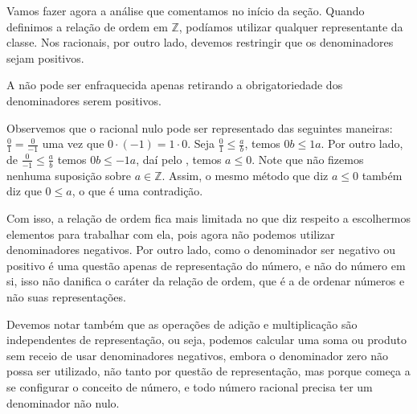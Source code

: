 \documentclass[../main.tex]{subfiles}
\begin{document}
Vamos fazer agora a análise que comentamos no início da seção. Quando definimos a relação de ordem em $\mathbb{Z}$, podíamos utilizar qualquer representante da classe. Nos racionais, por outro lado, devemos restringir que os denominadores sejam positivos.

\begin{afi}
    A  não pode ser enfraquecida apenas retirando a obrigatoriedade dos denominadores serem positivos.
\end{afi}

\begin{dem}
    Observemos que o racional nulo pode ser representado das seguintes maneiras: $\frac{0}{1} = \frac{0}{-1}$ uma vez que $0 \cdot (-1) = 1 \cdot 0$.
    Seja $\frac{0}{1} \leq \frac{a}{b}$, temos $0b \leq 1a$. Por outro lado, de $\frac{0}{-1} \leq \frac{a}{b}$ temos $0b \leq -1a$,
    daí pelo , temos $a \leq 0$. Note que não fizemos nenhuma suposição sobre $a \in \mathbb{Z}$. Assim, o mesmo método que diz $a \leq 0$ também diz que $0 \leq a$, o que é uma contradição.
\end{dem}

Com isso, a relação de ordem fica mais limitada no que diz respeito a escolhermos elementos para trabalhar com ela, pois agora não podemos utilizar denominadores negativos. Por outro lado, como o denominador ser negativo ou positivo é uma questão apenas de representação do número, e não do número em si, isso não danifica o caráter da relação de ordem, que é a de ordenar números e não suas representações. 

Devemos notar também que as operações de adição e multiplicação são independentes de representação, ou seja, podemos calcular uma soma ou produto sem receio de usar denominadores negativos, embora o denominador zero não possa ser utilizado, não tanto por questão de representação, mas porque começa a se configurar o conceito de número, e todo número racional precisa ter um denominador não nulo.
\end{document}
